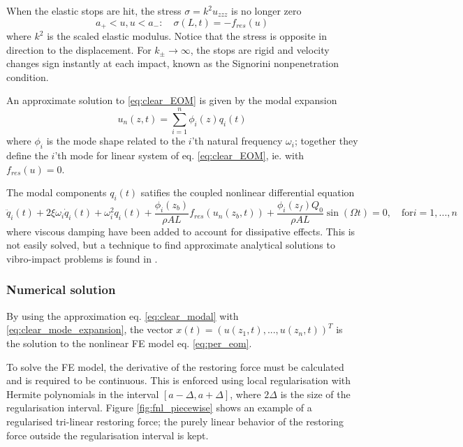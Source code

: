 When the elastic stops are hit, the stress $\sigma = k^2u_{zzz}$ is no longer
zero
\begin{equation}
  a_+ < u, u < a_-: \quad \sigma(L,t) = - f_{res}(u)
\end{equation}
where $k^2$ is the scaled elastic modulus. Notice that the stress is opposite in
direction to the displacement. For $k_\pm \to \infty$, the stops are rigid and
velocity changes sign instantly at each impact, known as the Signorini
nonpenetration condition.


An approximate solution to \eqref{eq:clear_EOM} is given by the modal expansion
\begin{equation}
  \label{eq:clear_modal}
  u_n(z,t) = \sum_{i=1}^n \phi_i(z) q_i(t)
\end{equation}
where $\phi_i$ is the mode shape related to the $i$'th natural frequency
$\omega_i$; together they define the $i$'th mode for linear system of eq.
\eqref{eq:clear_EOM}, ie. with $f_{res}(u) = 0$.

The modal components $q_i(t)$ satifies the coupled nonlinear differential
equation
\begin{equation}
  \ddot q_i(t) + 2 \xi \omega_i \dot q_i(t) + \omega_i^2 q_i(t) +
  \frac{\phi_i(z_b)}{\rho A L} f_{res}(u_n(z_b,t)) +
  \frac{\phi_i(z_f) Q_0}{\rho A L}\sin(\Omega t)
  = 0, \quad
  \text{for} i=1,...,n
\label{eq:clear_mode_expansion}
\end{equation}
where viscous damping have been added to account for dissipative effects. This
is not easily solved, but a technique to find approximate analytical solutions
to vibro-impact problems is found in \parencite{thomsen2008a}.


\subsubsection{Numerical solution}

By using the approximation eq. \eqref{eq:clear_modal} with
\ref{eq:clear_mode_expansion}, the vector $x(t)= (u(z_1,t),...,u(z_n,t))^T $ is
the solution to the nonlinear FE model eq. \eqref{eq:per_eom}.

To solve the FE model, the derivative of the restoring force must be calculated
and is required to be continuous. This is enforced using local regularisation
with Hermite polynomials in the interval $[a-\Delta, a+\Delta]$, where $2\Delta$
is the size of the regularisation interval.
Figure \ref{fig:fnl_piecewise} shows an example of a regularised tri-linear
restoring force; the purely linear behavior of the restoring force outside the
regularisation interval is kept.

